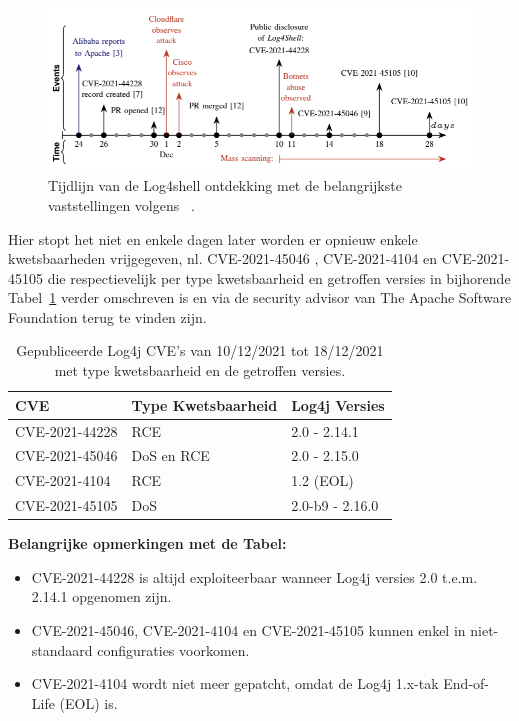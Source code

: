 \documentclass{hogent-article}
\begin{document}
\begin{figure}[!ht]
    \centering
    \includegraphics[width=1\linewidth]{img/log4shell-tijdlijn.png}
    \caption{Tijdlijn van de Log4shell ontdekking met de belangrijkste vaststellingen volgens ~\autocite{Hiesgen2022}.}
    \label{fig:log4shell-tijdlijn}
\end{figure} 

Hier stopt het niet en enkele dagen later worden er opnieuw enkele kwetsbaarheden vrijgegeven, nl. CVE-2021-45046 \autocite{Apache2022d}, CVE-2021-4104 \autocite{Apache2022e} en CVE-2021-45105 \autocite{Apache2022f} die respectievelijk per type kwetsbaarheid en getroffen versies in bijhorende Tabel~\ref{tab:CVE-list} verder omschreven is en via de security advisor van The Apache Software Foundation terug te vinden zijn.\autocite{Apache2022b}

\begin{table}[]
    \caption[CVE-list]{Gepubliceerde Log4j CVE's van 10/12/2021 tot 18/12/2021 met type kwetsbaarheid en de getroffen versies.}
    \begin{tabular}{@{}lll@{}}
        \toprule
        \textbf{CVE}   & \textbf{Type Kwetsbaarheid}    & \textbf{Log4j Versies}    \\ \midrule
        CVE-2021-44228 & RCE                            & 2.0 - 2.14.1              \\
        CVE-2021-45046 & DoS en RCE                     & 2.0 - 2.15.0              \\
        CVE-2021-4104  & RCE                            & 1.2 (EOL)                 \\
        CVE-2021-45105 & DoS                            & 2.0-b9 - 2.16.0           \\ \bottomrule
    \end{tabular}
    \label{tab:CVE-list}
    
    {\bf Belangrijke opmerkingen met de Tabel:}
    \begin{itemize}[leftmargin=*]
        \item CVE-2021-44228 is altijd exploiteerbaar wanneer Log4j versies 2.0 t.e.m. 2.14.1 opgenomen zijn.
        \item CVE-2021-45046, CVE-2021-4104 en CVE-2021-45105 kunnen enkel in niet-standaard configuraties voorkomen.
        \item CVE-2021-4104 wordt niet meer gepatcht, omdat de Log4j 1.x-tak End-of-Life (EOL) is.
    \end{itemize}
\end{table}
\end{document}
